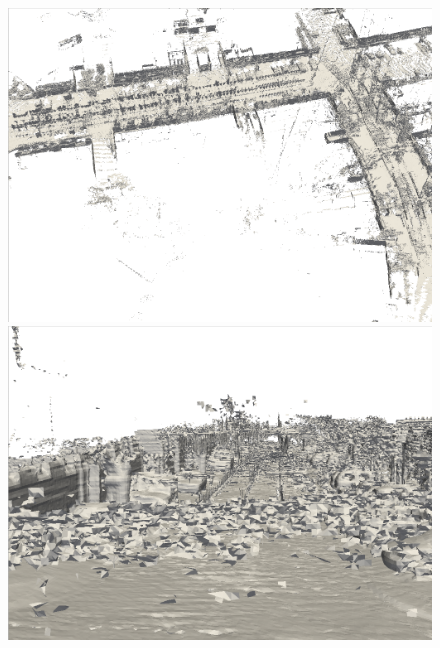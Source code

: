 \begin{figure}[htbp]
    \centering
    \begin{minipage}{0.5\linewidth}
    \centering
    \includegraphics[width=1\linewidth]{figures/kitti_1_voxblox.png}
    \end{minipage}\hfill
    \begin{minipage}{0.5\linewidth}
    \centering
    \includegraphics[width=1\linewidth]{figures/kitti_2_voxblox.png}
    \end{minipage}
    \vfill
    \begin{minipage}{0.5\linewidth}
    \centering

\end{minipage}
\end{figure}
